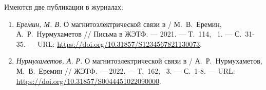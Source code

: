 Имеются две публикации в журналах:

\begin{enumerate}[beginpenalty=10000] %
	\item \textit{Еремин, М. В.} О магнитоэлектрической связи в \ncbo / М.~В.~Еремин, А.~Р.~Нурмухаметов // Письма в ЖЭТФ. --- 2021. --- Т.~114, \textnumero~1. --- С.~31-35. --- URL: \url{https://doi.org/10.31857/S1234567821130073}.
	\item \textit{Нурмухаметов, А. Р.} О магнитоэлектрической связи в \ncbo / А.~Р.~Нурмухаметов, М.~В.~Еремин // ЖЭТФ. --- 2022. --- Т.~162, \textnumero~3. --- С.~1-8. --- URL: \url{https://doi.org/10.31857/S0044451022090000}.
\end{enumerate}


